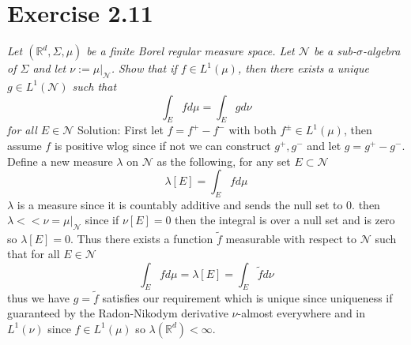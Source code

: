 \documentclass[11pt]{article}
\newcommand{\solution}[1]{{{\textcolor{header}{Solution:} \textcolor{solution}{#1}}}}
\begin{document}
\section{Exercise 2.11}
\emph{
    Let $( \mathbb{R}^{d}, \Sigma, \mu)$ be a finite Borel regular measure space. Let $\mathcal{N}$ be a sub-$\sigma$-algebra
    of $\Sigma$ and let  $\nu := \mu|_{\mathcal{N}}$. Show that if $f \in L^{1}(\mu)$, then there exists a unique $g \in L^{1}(\mathcal{N})$
    such that 
    \[
    \int_{E}^{}f d \mu = \int_{ E }^{} g d \nu
    \]
    for all $E \in \mathcal{N}$
}
\solution{
    First let $f = f^{+} - f^{-}$ with both $f^{\pm} \in L^{1}(\mu)$, then assume $f$ is positive wlog since if not we can construct $g^{+},g^{-}$ and let $g = g^{+} - g^{-}$.
    Define a new measure $\lambda$ on $\mathcal{N}$ as the following, for any set $E \subset \mathcal{N}$
    \[
       \lambda[E] = \int_{E}^{}f d \mu
    \] 
    $\lambda$ is a measure since it is countably additive and sends the null set to 0.
    then $\lambda << \nu = \mu|_{\mathcal{N}}$ since if $\nu[E] = 0$ then the integral is over a null set and is zero so $\lambda[E] = 0$. Thus there exists a function $\tilde f$ measurable with respect to $\mathcal{N}$ such that for all  $E \in \mathcal{N}$
     \[
         \int_{E}^{} f d \mu = \lambda[E] = \int_{E}^{}\tilde f d \nu
    \] 
    thus we have $g = \tilde f$ satisfies our requirement which is unique since uniqueness if guaranteed by the Radon-Nikodym derivative $\nu$-almost everywhere and in $L^{1}(\nu)$ since $f \in L^{1}(\mu)$ so $\lambda( \mathbb{R}^{d}) <\infty$.
}
\end{document}

